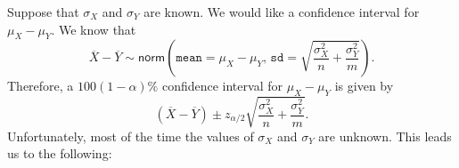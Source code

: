 Suppose that \(\sigma_{X}\) and \(\sigma_{Y}\) are known. We would
like a confidence interval for \(\mu_{X}-\mu_{Y}\). We know that
\begin{equation}
\overline{X}-\overline{Y}\sim\mathsf{norm}\left(\mathtt{mean}=\mu_{X}-\mu_{Y},\,\mathtt{sd}=\sqrt{\frac{\sigma_{X}^{2}}{n}+\frac{\sigma_{Y}^{2}}{m}}\right).
\end{equation}
Therefore, a \( 100(1-\alpha)\% \) confidence interval for
\(\mu_{X}-\mu_{Y}\) is given by
\begin{equation}
\label{eq-two-samp-mean-CI}
\left(\overline{X}-\overline{Y}\right)\pm z_{\alpha/2}\sqrt{\frac{\sigma_{X}^{2}}{n}+\frac{\sigma_{Y}^{2}}{m}}.
\end{equation}
Unfortunately, most of the time the values of \(\sigma_{X}\) and
\(\sigma_{Y}\) are unknown. This leads us to the following:
